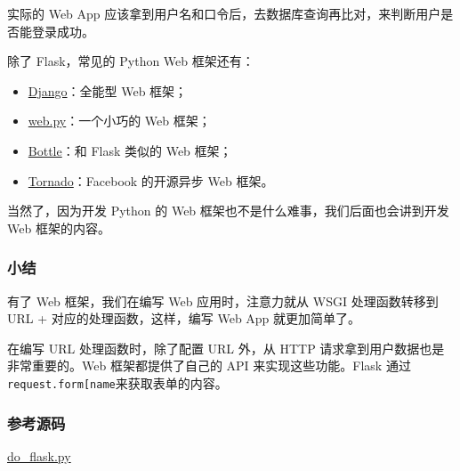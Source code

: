 实际的 Web App
应该拿到用户名和口令后，去数据库查询再比对，来判断用户是否能登录成功。

除了 Flask，常见的 Python Web 框架还有：

\begin{itemize}
\item
  \href{https://www.djangoproject.com/}{Django}：全能型 Web 框架；
\item
  \href{http://webpy.org/}{web.py}：一个小巧的 Web 框架；
\item
  \href{http://bottlepy.org/}{Bottle}：和 Flask 类似的 Web 框架；
\item
  \href{http://www.tornadoweb.org/}{Tornado}：Facebook 的开源异步 Web
  框架。
\end{itemize}

当然了，因为开发 Python 的 Web 框架也不是什么难事，我们后面也会讲到开发
Web 框架的内容。

\hypertarget{ux5c0fux7ed3}{%
\subsubsection{小结}\label{ux5c0fux7ed3}}

有了 Web 框架，我们在编写 Web 应用时，注意力就从 WSGI 处理函数转移到 URL
+ 对应的处理函数，这样，编写 Web App 就更加简单了。

在编写 URL 处理函数时，除了配置 URL 外，从 HTTP
请求拿到用户数据也是非常重要的。Web 框架都提供了自己的 API
来实现这些功能。Flask
通过\texttt{request.form{[}\textquotesingle{}name\textquotesingle{}{]}}来获取表单的内容。

\hypertarget{ux53c2ux8003ux6e90ux7801}{%
\subsubsection{参考源码}\label{ux53c2ux8003ux6e90ux7801}}

\href{https://github.com/michaelliao/learn-python3/blob/master/samples/web/do_flask.py}{do\_flask.py}

